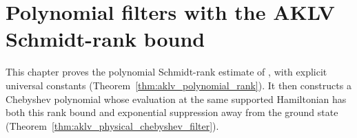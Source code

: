 \chapter{Polynomial filters with the AKLV Schmidt-rank bound}
\label{ch:aklv_polynomial_filters}

This chapter proves the polynomial Schmidt-rank estimate of
\cite[Lemma~4.2]{Arad2013AreaLaw}, with explicit universal constants
(Theorem~\ref{thm:aklv_polynomial_rank}). It then constructs a Chebyshev
polynomial whose evaluation at the same supported Hamiltonian has both
this rank bound and exponential suppression away from the ground state
(Theorem~\ref{thm:aklv_physical_chebyshev_filter}).





